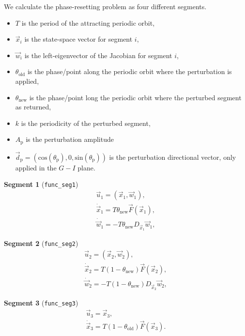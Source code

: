 \documentclass[11pt]{article}
\begin{document}
We calculate the phase-resetting problem as four different segments.
\begin{itemize}
  \item $T$ is the period of the attracting periodic orbit,
  \item $\vec{x}_{i}$ is the state-space vector for segment $i$,
  \item $\vec{w}_{i}$ is the left-eigenvector of the Jacobian for segment $i$,
  \item $\theta_{\mathrm{old}}$ is the phase/point along the periodic orbit where the perturbation is applied,
  \item $\theta_{\mathrm{new}}$ is the phase/point long the periodic orbit where the perturbed segment as returned,
  \item $k$ is the periodicity of the perturbed segment,
  \item $A_{\mathrm{p}}$ is the perturbation amplitude
  \item $\vec{d}_{\mathrm{p}} = \left( \mathrm{cos}(\theta_{\mathrm{p}}) , 0 , \mathrm{sin}(\theta_{\mathrm{p}}) \right)$ is the perturbation directional vector, only applied in the $G-I$ plane.
\end{itemize}

\textbf{Segment 1} (\verb!func_seg1!)
\begin{subequations}
  \begin{gather}
    \vec{u}_{1} = \left( \vec{x}_{1}, \vec{w}_{1} \right) , \\
    \dot{\vec{x}}_{1} = T \theta_{\mathrm{new}} \vec{F} (\vec{x}_{1}) , \\
    \dot{\vec{w}}_{1} = -T \theta_{\mathrm{new}} D_{\vec{x}_{1}} \vec{w}_{1},
  \end{gather}
\end{subequations}

\textbf{Segment 2} (\verb!func_seg2!)
\begin{subequations}
  \begin{gather}
    \vec{u}_{2} = \left( \vec{x}_{2}, \vec{w}_{2} \right) , \\
    \dot{\vec{x}}_{2} = T \left( 1 - \theta_{\mathrm{new}} \right) \vec{F} (\vec{x}_{2}) , \\
    \dot{\vec{w}}_{2} = -T \left( 1 - \theta_{\mathrm{new}} \right) D_{\vec{x}_{2}} \vec{w}_{2},
  \end{gather}
\end{subequations}

\textbf{Segment 3} (\verb!func_seg3!)
\begin{subequations}
  \begin{gather}
    \vec{u}_{3} = \vec{x}_{3} ,\\
    \dot{\vec{x}}_{3} = T \left( 1 - \theta_{\mathrm{old}} \right) \vec{F} (\vec{x}_{3}) .
  \end{gather}
\end{subequations}
\end{document}

